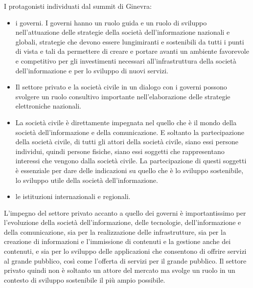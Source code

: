 I protagonisti individuati dal summit di Ginevra:

\begin{itemize}
    \item i governi. I governi hanno un ruolo guida e un ruolo di sviluppo nell'attuazione delle strategie della società dell'informazione nazionali e globali, strategie che devono essere lungimiranti e sostenibili da tutti i punti di vista e tali da permettere di creare e portare avanti un ambiente favorevole e competitivo per gli investimenti necessari all'infrastruttura della società dell'informazione e per lo sviluppo di nuovi servizi.
    \item Il settore privato e la società civile in un dialogo con i governi possono svolgere un ruolo consultivo importante nell'elaborazione delle strategie elettroniche nazionali.
    \item La società civile è direttamente impegnata nel quello che è il mondo della società dell'informazione e della comunicazione. E soltanto la partecipazione della società civile, di tutti gli attori della società civile, siano essi persone individui, quindi persone fisiche, siano essi soggetti che rappresentano interessi che vengono dalla società civile. La partecipazione di questi soggetti è essenziale per dare delle indicazioni su quello che è lo sviluppo sostenibile, lo sviluppo utile della società dell'informazione.
    \item le istituzioni internazionali e regionali.
\end{itemize}

L'impegno del settore privato accanto a quello dei governi è importantissimo per l'evoluzione della società dell'informazione, delle tecnologie, dell'informazione e della comunicazione, sia per la realizzazione delle infrastrutture, sia per la creazione di informazioni e l'immissione di contenuti e la gestione anche dei contenuti, e sia per lo sviluppo delle applicazioni che consentono di offrire servizi al grande pubblico, così come l'offerta di servizi per il grande pubblico. Il settore privato quindi non è soltanto un attore del mercato ma svolge un ruolo in un contesto di sviluppo sostenibile il più ampio possibile.\par

